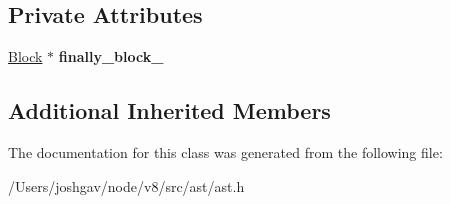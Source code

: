 \subsection*{Private Attributes}
\begin{DoxyCompactItemize}
\item 
\hyperlink{classv8_1_1internal_1_1_block}{Block} $\ast$ {\bfseries finally\+\_\+block\+\_\+}\hypertarget{classv8_1_1internal_1_1_try_finally_statement_a012a86c91a66f6fb8e8ac8dd87301768}{}\label{classv8_1_1internal_1_1_try_finally_statement_a012a86c91a66f6fb8e8ac8dd87301768}

\end{DoxyCompactItemize}
\subsection*{Additional Inherited Members}


The documentation for this class was generated from the following file\+:\begin{DoxyCompactItemize}
\item 
/\+Users/joshgav/node/v8/src/ast/ast.\+h\end{DoxyCompactItemize}
